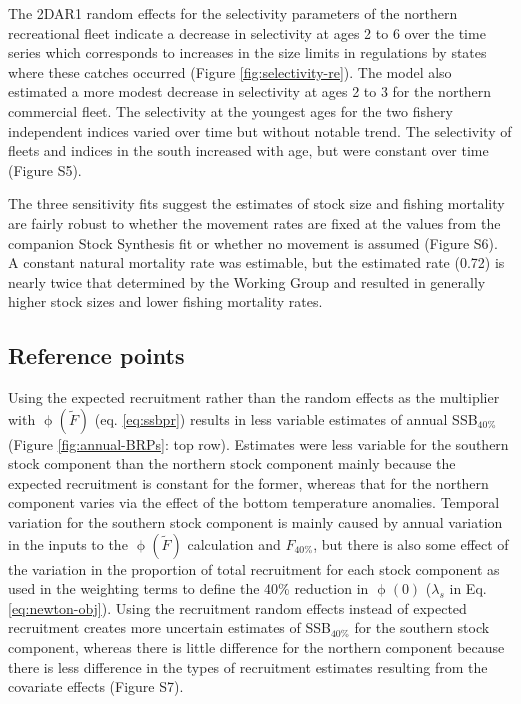 \documentclass[
]{article}
\begin{document}
The 2DAR1 random effects for the selectivity parameters of the northern recreational fleet indicate a decrease in selectivity at ages 2 to 6 over the time series which corresponds to increases in the size limits in regulations by states where these catches occurred (Figure \ref{fig:selectivity-re}). The model also estimated a more modest decrease in selectivity at ages 2 to 3 for the northern commercial fleet. The selectivity at the youngest ages for the two fishery independent indices varied over time but without notable trend. The selectivity of fleets and indices in the south increased with age, but were constant over time (Figure S5).

The three sensitivity fits suggest the estimates of stock size and fishing mortality are fairly robust to whether the movement rates are fixed at the values from the companion Stock Synthesis fit or whether no movement is assumed (Figure S6). A constant natural mortality rate was estimable, but the estimated rate (0.72) is nearly twice that determined by the Working Group and resulted in generally higher stock sizes and lower fishing mortality rates.

\hypertarget{reference-points-1}{%
\subsection*{Reference points}\label{reference-points-1}}

Using the expected recruitment rather than the random effects as the multiplier with \(\upphi(\widetilde{F})\) (eq. \ref{eq:ssbpr}) results in less variable estimates of annual SSB\(_{40\%}\) (Figure \ref{fig:annual-BRPs}: top row). Estimates were less variable for the southern stock component than the northern stock component mainly because the expected recruitment is constant for the former, whereas that for the northern component varies via the effect of the bottom temperature anomalies. Temporal variation for the southern stock component is mainly caused by annual variation in the inputs to the \(\upphi(\widetilde{F})\) calculation and \(F_{40\%}\), but there is also some effect of the variation in the proportion of total recruitment for each stock component as used in the weighting terms to define the 40\% reduction in \(\upphi(0)\) (\(\lambda_s\) in Eq. \ref{eq:newton-obj}). Using the recruitment random effects instead of expected recruitment creates more uncertain estimates of SSB\(_{40\%}\) for the southern stock component, whereas there is little difference for the northern component because there is less difference in the types of recruitment estimates resulting from the covariate effects (Figure S7).
\end{document}
